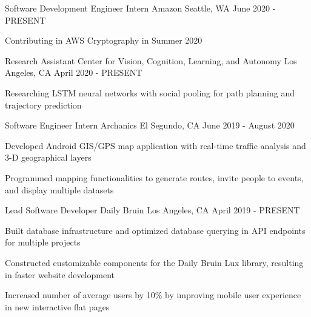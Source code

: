 \documentclass[12pt, letterpaper]{awesome-cv}
\begin{document}
\begin{cventries}
  \cventry
    {Software Development Engineer Intern} %
    {Amazon} %
    {Seattle, WA} %
    {June 2020 - PRESENT} %
    {
      \begin{cvitems} %
        \item {Contributing in AWS Cryptography in Summer 2020}
      \end{cvitems}
    }

  \cventry
    {Research Assistant} %
    {Center for Vision, Cognition, Learning, and Autonomy} %
    {Los Angeles, CA} %
    {April 2020 - PRESENT} %
    {
      \begin{cvitems} %
        \item {Researching LSTM neural networks with social pooling for path planning and trajectory prediction}
      \end{cvitems}
    }

  \cventry
    {Software Engineer Intern} %
    {Archanics} %
    {El Segundo, CA} %
    {June 2019 - August 2020} %
    {
      \begin{cvitems} %
        \item {Developed Android GIS/GPS map application with real-time traffic analysis and 3-D geographical layers}
        \item {Programmed mapping functionalities to generate routes, invite people to events, and display multiple datasets}
      \end{cvitems}
    }

  \cventry
    {Lead Software Developer} %
    {Daily Bruin} %
    {Los Angeles, CA} %
    {April 2019 - PRESENT} %
    {
      \begin{cvitems} %
        \item {Built database infrastructure and optimized database querying in API endpoints for multiple projects}
		    \item {Constructed customizable components for the Daily Bruin Lux library, resulting in faster website development}
		    \item {Increased number of average users by 10\% by improving mobile user experience in new interactive flat pages}
      \end{cvitems}
    }

\end{cventries}
\end{document}
